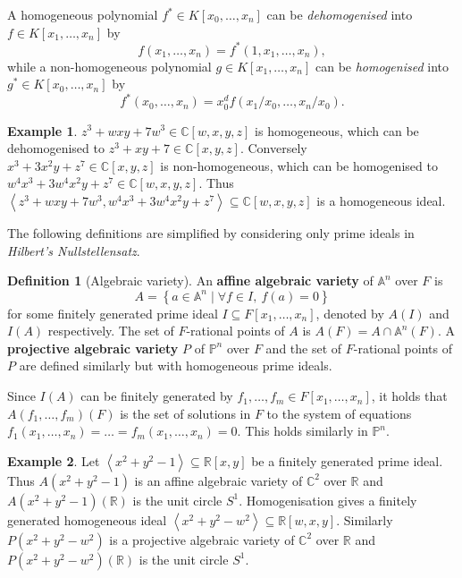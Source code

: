 \documentclass{article}
\newcommand{\R}{\mathbb{R}}
\newcommand{\C}{\mathbb{C}}
\newcommand{\A}{\mathbb{A}}
\renewcommand{\P}{\mathbb{P}}
\newcommand{\rb}[1]{\left( #1 \right)}
\renewcommand{\sb}[1]{\left[ #1 \right]}
\newcommand{\cb}[1]{\left\{ #1 \right\}}
\newcommand{\ab}[1]{\left\langle #1 \right\rangle}
\theoremstyle{definition}\newtheorem*{definition}{Definition}
\theoremstyle{definition}\newtheorem*{example}{Example}
\theoremstyle{definition}\newtheorem*{remark}{Remark}
\begin{document}
A homogeneous polynomial $ f^* \in K\sb{x_0, \dots, x_n} $ can be \emph{dehomogenised} into $ f \in K\sb{x_1, \dots, x_n} $ by
$$ f\rb{x_1, \dots, x_n} = f^*\rb{1, x_1, \dots, x_n}, $$
while a non-homogeneous polynomial $ g \in K\sb{x_1, \dots, x_n} $ can be \emph{homogenised} into $ g^* \in K\sb{x_0, \dots, x_n} $ by
$$ f^*\rb{x_0, \dots, x_n} = x_0^d f\rb{x_1 / x_0, \dots, x_n / x_0}. $$

\begin{example}
$ z^3 + wxy + 7w^3 \in \C\sb{w, x, y, z} $ is homogeneous, which can be dehomogenised to $ z^3 + xy + 7 \in \C\sb{x, y, z} $. Conversely $ x^3 + 3x^2y + z^7 \in \C\sb{x, y, z} $ is non-homogeneous, which can be homogenised to $ w^4x^3 + 3w^4x^2y + z^7 \in \C\sb{w, x, y, z} $. Thus $ \ab{z^3 + wxy + 7w^3, w^4x^3 + 3w^4x^2y + z^7} \subseteq \C\sb{w, x, y, z} $ is a homogeneous ideal.
\end{example}

The following definitions are simplified by considering only prime ideals in \emph{Hilbert's Nullstellensatz}.

\begin{definition}[Algebraic variety]
An \textbf{affine algebraic variety} of $ \A^n $ over $ F $ is
$$ A = \cb{a \in \A^n \mid \forall f \in I, \ f\rb{a} = 0} $$
for some finitely generated prime ideal $ I \subseteq F\sb{x_1, \dots, x_n} $, denoted by $ A\rb{I} $ and $ I\rb{A} $ respectively. The set of $ F $-rational points of $ A $ is $ A\rb{F} = A \cap \A^n\rb{F} $. A \textbf{projective algebraic variety} $ P $ of $ \P^n $ over $ F $ and the set of $ F $-rational points of $ P $ are defined similarly but with homogeneous prime ideals.
\end{definition}

Since $ I\rb{A} $ can be finitely generated by $ f_1, \dots, f_m \in F\sb{x_1, \dots, x_n} $, it holds that $ A\rb{f_1, \dots, f_m}\rb{F} $ is the set of solutions in $ F $ to the system of equations $ f_1\rb{x_1, \dots, x_n} = \dots = f_m\rb{x_1, \dots, x_n} = 0 $. This holds similarly in $ \P^n $.

\begin{example}
Let $ \ab{x^2 + y^2 - 1} \subseteq \R\sb{x, y} $ be a finitely generated prime ideal. Thus $ A\rb{x^2 + y^2 - 1} $ is an affine algebraic variety of $ \C^2 $ over $ \R $ and $ A\rb{x^2 + y^2 - 1}\rb{\R} $ is the unit circle $ S^1 $. Homogenisation gives a finitely generated homogeneous ideal $ \ab{x^2 + y^2 - w^2} \subseteq \R\sb{w, x, y} $. Similarly $ P\rb{x^2 + y^2 - w^2} $ is a projective algebraic variety of $ \C^2 $ over $ \R $ and $ P\rb{x^2 + y^2 - w^2}\rb{\R} $ is the unit circle $ S^1 $.
\end{example}
\end{document}
